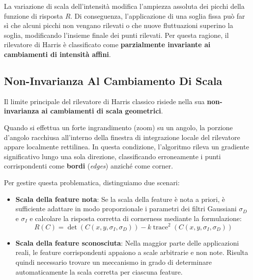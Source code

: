 ﻿\documentclass[11pt, a4paper]{article}
\begin{document}

La variazione di scala dell'intensità modifica l'ampiezza assoluta dei picchi della funzione di risposta $R$. Di conseguenza, l'applicazione di una soglia fissa può far sì che alcuni picchi non vengano rilevati o che nuove fluttuazioni superino la soglia, modificando l'insieme finale dei punti rilevati. Per questa ragione, il rilevatore di Harris è classificato come \textbf{parzialmente invariante ai cambiamenti di intensità affini}.

\subsection{Non-Invarianza Al Cambiamento Di Scala}

Il limite principale del rilevatore di Harris classico risiede nella sua \textbf{non-invarianza ai cambiamenti di scala geometrici}.


Quando si effettua un forte ingrandimento (zoom) su un angolo, la porzione d'angolo racchiusa all'interno della finestra di integrazione locale del rilevatore appare localmente rettilinea. In questa condizione, l'algoritmo rileva un gradiente significativo lungo una sola direzione, classificando erroneamente i punti corrispondenti come \textbf{bordi} (\emph{edges}) anziché come corner.

Per gestire questa problematica, distinguiamo due scenari:
\begin{itemize}
    \item \textbf{Scala della feature nota}: Se la scala della feature è nota a priori, è sufficiente adattare in modo proporzionale i parametri dei filtri Gaussiani $\sigma_D$ e $\sigma_I$ e calcolare la risposta corretta di cornerness mediante la formulazione:
    \[ R(C) = \det(C(x, y, \sigma_I, \sigma_D)) - k \operatorname{trace}^2(C(x, y, \sigma_I, \sigma_D)) \]
    \item \textbf{Scala della feature sconosciuta}: Nella maggior parte delle applicazioni reali, le feature corrispondenti appaiono a scale arbitrarie e non note. Risulta quindi necessario trovare un meccanismo in grado di determinare automaticamente la scala corretta per ciascuna feature.
\end{itemize}
\end{document}
